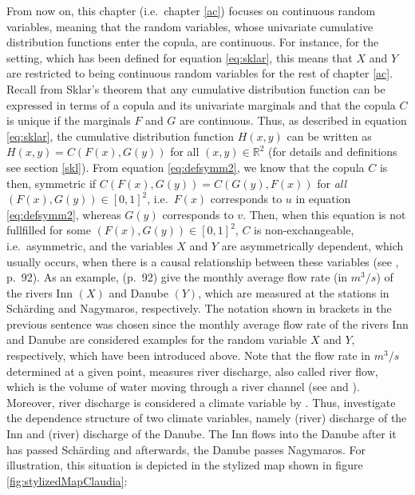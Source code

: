 \documentclass[
]{krantz}
\begin{document}
From now on, this chapter (i.e.~chapter \ref{ac}) focuses on continuous random variables, meaning that the random variables, whose univariate cumulative distribution functions enter the copula, are continuous. For instance, for the setting, which has been defined for equation \eqref{eq:sklar}, this means that \(X\) and \(Y\) are restricted to being continuous random variables for the rest of chapter \ref{ac}. Recall from Sklar's theorem that any cumulative distribution function can be expressed in terms of a copula and its univariate marginals and that the copula \(C\) is unique if the marginals \(F\) and \(G\) are continuous. Thus, as described in equation \eqref{eq:sklar}, the cumulative distribution function \(H(x, y)\) can be written as \(H(x, y)=C(F(x), G(y))\) for all \((x, y) \in \mathbb{R}^2\) (for details and definitions see section \ref{skl}). From equation \eqref{eq:defsymm2}, we know that the copula \(C\) is then, symmetric if \(C(F(x), G(y)) = C(G(y), F(x))\) for \emph{all} \((F(x), G(y)) \in [0,1]^2\), i.e.~\(F(x)\) corresponds to \(u\) in equation \eqref{eq:defsymm2}, whereas \(G(y)\) corresponds to \(v\). Then, when this equation is not fullfilled for some \((F(x), G(y)) \in [0,1]^2\), \(C\) is non-exchangeable, i.e.~asymmetric, and the variables \(X\) and \(Y\) are asymmetrically dependent, which usually occurs, when there is a causal relationship between these variables (see \citet{genest2013}, p.~92). As an example, \citet{genest2013} (p.~92) give the monthly average flow rate (in \(m^3/s\)) of the rivers Inn \((X)\) and Danube \((Y)\), which are measured at the stations in Schärding and Nagymaros, respectively. The notation shown in brackets in the previous sentence was chosen since the monthly average flow rate of the rivers Inn and Danube are considered examples for the random variable \(X\) and \(Y\), respectively, which have been introduced above. Note that the flow rate in \(m^3/s\) determined at a given point, measures river discharge, also called river flow, which is the volume of water moving through a river channel (see \citet{copernicus2022} and \citet{copernicus2023}). Moreover, river discharge is considered a climate variable by \citet{copernicus2023}. Thus, \citet{genest2013} investigate the dependence structure of two climate variables, namely (river) discharge of the Inn and (river) discharge of the Danube. The Inn flows into the Danube after it has passed Schärding and afterwards, the Danube passes Nagymaros. For illustration, this situation is depicted in the stylized map shown in figure \ref{fig:stylizedMapClaudia}:
\end{document}
